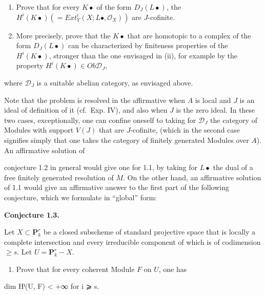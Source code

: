 \documentclass[
  11pt,
  a4paper,
]{book}
\newenvironment{Shaded}{}{}
\newcommand{\NormalTok}[1]{#1}
\providecommand{\tightlist}{%
  \setlength{\itemsep}{0pt}\setlength{\parskip}{0pt}}
\begin{document}
\begin{enumerate}
\def\labelenumi{(\roman{enumi})}
\setcounter{enumi}{1}
\item
  Prove that for every \(K\bullet\) of the form \(D_{J}(L\bullet)\), the
  \(H^{i}(K\bullet) (= Ext^{i}_{Y}(X; L\bullet,
  \mathcal{O}_{X}))\) are \(J\)-cofinite.
\item
  More precisely, prove that the \(K\bullet\) that are homotopic to a
  complex of the form \(D_{J}(L\bullet)\) can be characterized by
  finiteness properties of the \(H^{i}(K\bullet)\), stronger than the
  one envisaged in (ii), for example by the property
  \(H^{i}(K\bullet) \in Ob \mathcal{D}_{J}\),
\end{enumerate}

where \(\mathcal{D}_{J}\) is a suitable abelian category, as envisaged
above.

Note that the problem is resolved in the affirmative when \(A\) is local
and \(J\) is an ideal of definition of it (cf.~Exp. IV), and also when
\(J\) is the zero ideal. In these two cases, exceptionally, one can
confine oneself to taking for \(\mathcal{D}_{J}\) the category of
Modules with support \(V(J)\) that are \(J\)-cofinite, (which in the
second case signifies simply that one takes the category of finitely
generated Modules over \(A\)). An affirmative solution of

conjecture 1.2 in general would give one for 1.1, by taking for
\(L\bullet\) the dual of a free finitely generated resolution of \(M\).
On the other hand, an affirmative solution of 1.1 would give an
affirmative answer to the first part of the following conjecture, which
we formulate in ``global'' form:

\textbf{Conjecture 1.3.}

Let \(X \subset \mathbf{P}^{r}_{k}\) be a closed subscheme of standard
projective space that is locally a complete intersection and every
irreducible component of which is of codimension \(\geqslant s\). Let
\(U = \mathbf{P}^{r}_{k} - X\).

\begin{enumerate}
\def\labelenumi{(\roman{enumi})}
\tightlist
\item
  Prove that for every coherent Module \(F\) on \(U\), one has
\end{enumerate}

\begin{Shaded}
\begin{Highlighting}[]
\NormalTok{dim Hⁱ(U, F) \textless{} +∞   for i ⩾ s.}
\end{Highlighting}
\end{Shaded}
\end{document}
